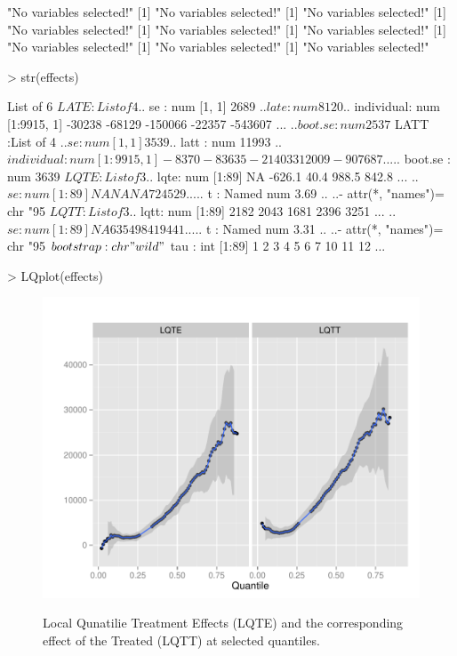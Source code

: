 \documentclass{amsart}
\begin{document}
\begin{Schunk}
\begin{Soutput}
[1] "No variables selected!"
[1] "No variables selected!"
[1] "No variables selected!"
[1] "No variables selected!"
[1] "No variables selected!"
[1] "No variables selected!"
[1] "No variables selected!"
[1] "No variables selected!"
[1] "No variables selected!"
\end{Soutput}
\end{Schunk}
\begin{Schunk}
\begin{Sinput}
> str(effects)
\end{Sinput}
\begin{Soutput}
List of 6
 $ LATE     :List of 4
  ..$ se        : num [1, 1] 2689
  ..$ late      : num 8120
  ..$ individual: num [1:9915, 1] -30238 -68129 -150066 -22357 -543607 ...
  ..$ boot.se   : num 2537
 $ LATT     :List of 4
  ..$ se        : num [1, 1] 3539
  ..$ latt      : num 11993
  ..$ individual: num [1:9915, 1] -8370 -83635 -214033 12009 -907687 ...
  ..$ boot.se   : num 3639
 $ LQTE     :List of 3
  ..$ lqte: num [1:89] NA -626.1 40.4 988.5 842.8 ...
  ..$ se  : num [1:89] NA NA NA 724 529 ...
  ..$ t   : Named num 3.69
  .. ..- attr(*, "names")= chr "95%
 $ LQTT     :List of 3
  ..$ lqtt: num [1:89] 2182 2043 1681 2396 3251 ...
  ..$ se  : num [1:89] NA 635 498 419 441 ...
  ..$ t   : Named num 3.31
  .. ..- attr(*, "names")= chr "95%
 $ bootstrap: chr "wild"
 $ tau      : int [1:89] 1 2 3 4 5 6 7 10 11 12 ...
\end{Soutput}
\end{Schunk}

\begin{Schunk}
\begin{Sinput}
> LQplot(effects)
\end{Sinput}
\end{Schunk}
\begin{figure}[h!]
\begin{center}
\label{Program}
\includegraphics{Program}
\end{center}
\caption{Local Qunatilie Treatment Effects (LQTE) and the corresponding effect of the Treated (LQTT) at selected quantiles.}
\end{figure}
\end{document}

